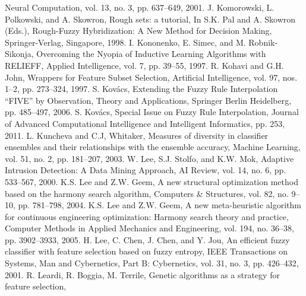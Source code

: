 Neural Computation,
vol. 13, no. 3, pp. 637--649,
2001.
J. Komorowski, L. Polkowski, and A. Skowron,
Rough sets: a tutorial,
In S.K. Pal and A. Skowron (Eds.), Rough-Fuzzy Hybridization: A New Method for Decision Making,
Springer-Verlag, Singapore,
1998.
I. Kononenko, E. Simec, and M. Robnik- Sikonja,
Overcoming the Nyopia of Inductive Learning Algorithms with RELIEFF,
Applied Intelligence,
vol. 7, pp. 39--55,
1997.
R. Kohavi and G.H. John,
Wrappers for Feature Subset Selection,
Artificial Intelligence,
vol. 97, nos. 1--2, pp. 273--324,
1997.
S. Kov\'{a}cs,
Extending the Fuzzy Rule Interpolation ``FIVE'' by Observation,
Theory and Applications, Springer Berlin Heidelberg,
pp. 485--497,
2006.
S. Kov\'{a}cs,
Special Issue on Fuzzy Rule Interpolation,
Journal of Advanced Computational Intelligence and Intelligent Informatics,
pp. 253,
2011.
L. Kuncheva and C.J, Whitaker,
Measures of diversity in classifier ensembles and their relationships with the ensemble accuracy,
Machine Learning,
vol. 51, no. 2, pp. 181--207,
2003.
W. Lee, S.J. Stolfo, and K.W. Mok,
Adaptive Intrusion Detection: A Data Mining Approach,
AI Review,
vol. 14, no. 6, pp. 533--567,
2000.
K.S. Lee and Z.W. Geem,
A new structural optimization method based on the harmony search algorithm,
Computers \& Structures,
vol. 82, no. 9--10, pp. 781--798,
2004.
K.S. Lee and Z.W. Geem,
A new meta-heuristic algorithm for continuous engineering optimization: Harmony search theory and practice,
Computer Methods in Applied Mechanics and Engineering,
vol. 194, no. 36--38, pp. 3902--3933,
2005.
H. Lee, C. Chen, J. Chen, and Y. Jou,
An efficient fuzzy classifier with feature selection based on fuzzy entropy,
IEEE Transactions on Systems, Man and Cybernetics, Part B: Cybernetics,
vol. 31, no. 3, pp. 426--432,
2001.
R. Leardi, R. Boggia, M. Terrile,
Genetic algorithms as a strategy for feature selection,
